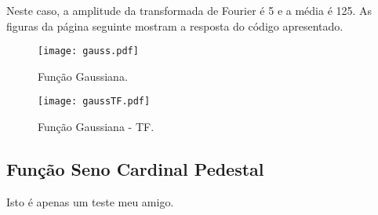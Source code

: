 Neste caso, a amplitude da transformada de Fourier é 5 e a média é 125. As figuras da página seguinte mostram a resposta do código apresentado.

\newpage

\begin{figure}[!ht]
    \centering
    \begin{minipage}[b]{0.49\textwidth}
        \centering
        \texttt{[image: gauss.pdf]}
        \caption{Função Gaussiana.}
    \end{minipage}
    \hfill
    \begin{minipage}[b]{0.49\textwidth}
        \centering
        \texttt{[image: gaussTF.pdf]}
        \caption{Função Gaussiana - TF.}
    \end{minipage}
\end{figure}

\subsection{Função Seno Cardinal \boldmath{$\rightarrow$} Pedestal}

Isto é apenas um teste meu amigo.
